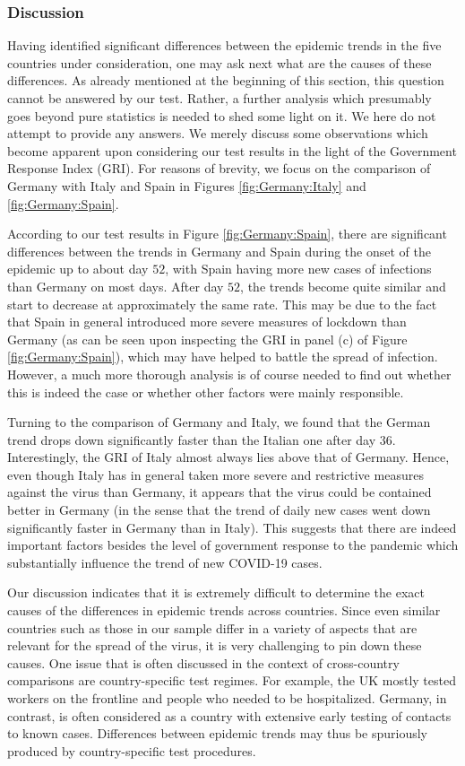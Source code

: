 \documentclass[a4paper,12pt]{article}
\numberwithin{equation}{section}
\begin{document}
\subsubsection{Discussion}


Having identified significant differences between the epidemic trends in the five countries under consideration, one may ask next what are the causes of these differences. As already mentioned at the beginning of this section, this question cannot be answered by our test. Rather, a further analysis which presumably goes beyond pure statistics is needed to shed some light on it. We here do not attempt to provide any answers. We merely discuss some observations which become apparent upon considering our test results in the light of the Government Response Index (GRI). For reasons of brevity, we focus on the comparison of Germany with Italy and Spain in Figures \ref{fig:Germany:Italy} and \ref{fig:Germany:Spain}. 


According to our test results in Figure \ref{fig:Germany:Spain}, there are significant differences between the trends in Germany and Spain during the onset of the epidemic up to about day $52$, with Spain having more new cases of infections than Germany on most days. After day $52$, the trends become quite similar and start to decrease at approximately the same rate. This may be due to the fact that Spain in general introduced more severe measures of lockdown than Germany (as can be seen upon inspecting the GRI in panel (c) of Figure \ref{fig:Germany:Spain}), which may have helped to battle the spread of infection. However, a much more thorough analysis is of course needed to find out whether this is indeed the case or whether other factors were mainly responsible. 


Turning to the comparison of Germany and Italy, we found that the German trend drops down significantly faster than the Italian one after day $36$. Interestingly, the GRI of Italy almost always lies above that of Germany. Hence, even though Italy has in general taken more severe and restrictive measures against the virus than Germany, it appears that the virus could be contained better in Germany (in the sense that the trend of daily new cases went down significantly faster in Germany than in Italy). This suggests that there are indeed important factors besides the level of government response to the pandemic which substantially influence the trend of new COVID-19 cases. 


Our discussion indicates that it is extremely difficult to determine the exact causes of the differences in epidemic trends across countries. Since even similar countries such as those in our sample differ in a variety of aspects that are relevant for the spread of the virus, it is very challenging to pin down these causes. One issue that is often discussed in the context of cross-country comparisons are country-specific test regimes. For example, the UK mostly tested workers on the frontline and people who needed to be hospitalized. Germany, in contrast, is often considered as a country with extensive early testing of contacts to known cases. Differences between epidemic trends may thus be spuriously produced by country-specific test procedures. 
\end{document}
